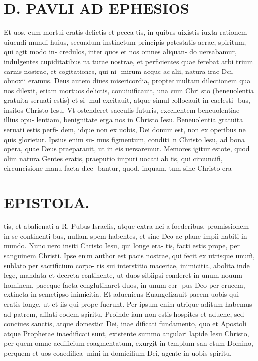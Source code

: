 \documentclass{article}
\begin{document}
\begin{pages}
\section*{D. PAVLI AD EPHESIOS }
\marginpar{[ p.1. ]}
\marginpar{[ p.2. ]}
\marginpar{[ p.3. ]}
\marginpar{[ p.4. ]}\pstart Et uos, cum mortui eratis delictis et pecca tis, in quibus uixistis iuxta rationem uiuendi mundi huius, secundum instinctum principis potestatis aerae, spiritum, qui agit modo in- credulos, inter quos et nos omnes aliquan- do uersabamur, indulgentes cupiditatibus na turae nostrae, et perficientes quae ferebat arbi trium carnis nostrae, et cogitationes, qui ni- mirum aeque ac alii, natura irae Dei, obnoxii eramus.  \pend\pstart Deus autem diues misericordia, propter multam dilectionem qua nos dilexit, etiam mortuos delictis, conuiuificauit, una cum Chri sto (beneuolentia gratuita seruati estis) et si- mul excitauit, atque  simul collocauit in caelesti- bus, insitos Christo Iesu. Vt ostenderet saeculis futuris, excellentem beneuolentiae illius opu- lentiam, benignitate erga nos in Christo Iesu.  \pend\pstart Beneuolentia gratuita seruati estis perfi- dem, idque  non ex uobis, Dei donum est, non ex operibus ne quis glorietur. Ipsius enim su- mus figmentum, conditi in Christo lesu, ad bona opera, quae Deus praeparauit, ut in eis uersaremur.  \pend\pstart Memores igitur estote, quod olim natura Gentes eratis, praeputio impuri uocati ab iis, qui circuncifi, circuncisione manu facta dice- bantur, quod, inquam, tum sine Christo era-  \pend
\section*{EPISTOLA.  }
\marginpar{[ p.11 ]}
\marginpar{[ p.5. ]}
\marginpar{[ p.6. ]}
\marginpar{[ p.7. ]}\pstart tis, et abalienati a R. Pubus  Israelis, atque  extra nei a foederibus, promissionem in se continenti bus, nullam spem habentes, et sine Deo ac plane impii habiti in mundo.  \pend\pstart Nunc uero insiti Christo Iesu, qui longe era- tis, facti estis prope, per sanguinem Christi. Ipse enim author est pacis nostrae, qui fecit ex utrisque  unum̃, sublato per sacrificium corpo- ris sui interstitio maceriae, inimicitia, abolita inde lege, mandata et decreta continente, ut duos sibiipsi conderet in unum nouum hominem, paceque  facta conglutinaret duos, in unum cor- pus Deo per crucem, extincta in semetipso inimicitia.  \pend\pstart Et adueniens Euangelizauit pacem uobis qui eratis longe, ut et iis qui prope fuerunt. Per ipsum enim utrique aditum habemus ad patrem, afflati eodem spiritu.  \pend\pstart Proinde iam non estis hospites et aduene, sed conciues sanctis, atque domestici Dei, inae dificati fundamento, quo et Apostoli atque Prophetae inaedificati sunt, existente summo angulari lapide Iesu Christo, per quem omne aedificium coagmentatum, exurgit in templum san ctum Domino, perquem et uos coaedifica- mini in domicilium Dei, agente in uobis spiritu.  \pend

\end{pages}
\end{document}
